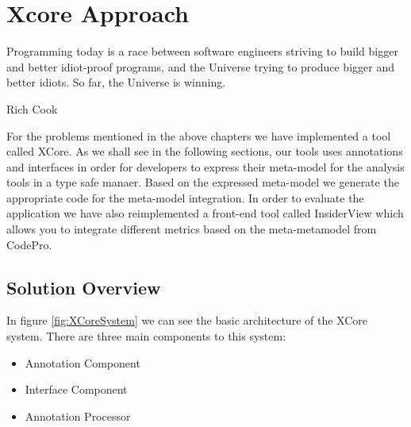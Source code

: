 \chapter{Xcore Approach}\label{ch:2}

\epigraph{Programming today is a race between software engineers striving to
build bigger and better idiot-proof programs, and the Universe trying to produce
bigger and better idiots. So far, the Universe is winning.}{Rich Cook}

        For the problems mentioned in the above chapters we have implemented a tool called XCore.
As we shall see in the following sections, our tools uses annotations and interfaces in order for developers
to express their meta-model for the analysis tools in a type safe manaer. Based on the expressed meta-model
we generate the appropriate code for the meta-model integration.
        In order to evaluate the application we have also reimplemented a front-end tool called InsiderView 
\cite{tools:iPlasma} which allows you to integrate different  metrics based on the meta-metamodel from CodePro.

\section {Solution Overview}\label{ch:2.1}

        In figure \ref{fig:XCoreSystem} we can see the basic architecture of the XCore system. There are three main components to this
system:
        \begin{itemize}
                \item Annotation Component
                \item Interface Component
                \item Annotation Processor
        \end{itemize}
        
